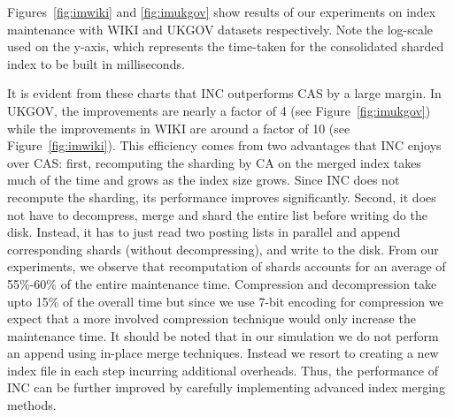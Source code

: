 Figures~\ref{fig:imwiki} and \ref{fig:imukgov} show results of our
experiments on index maintenance with WIKI and UKGOV datasets
respectively. Note the log-scale used on the y-axis,
which represents the time-taken for the consolidated sharded index to
be built in milliseconds. 


It is evident from these charts that INC outperforms CAS by a large margin. In UKGOV, the improvements are nearly a factor of 4 (see Figure~\ref{fig:imukgov}) while the improvements in WIKI are around a factor of 10 (see Figure~\ref{fig:imwiki}).  This efficiency comes from two advantages that INC
enjoys over CAS: first, recomputing the sharding by CA on the merged
index takes much of the time and grows as the index size grows. Since
INC does not recompute the sharding, its performance improves
significantly. Second, it does not have to decompress, merge and shard
the entire list before writing do the disk. Instead, it has to just
read two posting lists in parallel and append corresponding shards
(without decompressing), and write to the disk. From our experiments, we observe that recomputation of shards accounts for an average of 55\%-60\% of the entire maintenance time. Compression and decompression take upto 15\% of the overall time but since we use 7-bit encoding for compression we expect that a more involved compression technique would only increase the maintenance time. It should be noted
that in our simulation we do not perform an append using in-place merge techniques. Instead we resort
to creating a new index file in each step incurring additional
overheads. Thus, the performance of INC can be further improved by
carefully implementing advanced index merging methods.


